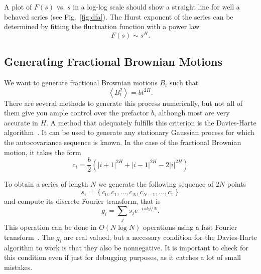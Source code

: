A plot of $F(s)$ vs. $s$ in a log-log scale should show a straight line for
well a behaved series (see Fig.~\ref{fig:dfa}). The Hurst exponent of the
series can be determined by fitting the fluctuation function with a power law
\begin{equation}
    F(s)\sim s^H.
\end{equation}

\subsection{Generating Fractional Brownian Motions}
\label{sec:fbm}

We want to generate fractional Brownian motions $B_t$ such that
\begin{equation}
    \label{eq:fbm}
    \left\langle B_t^2 \right\rangle = bt^{2H}.
\end{equation}
There are several methods to generate this process numerically, but not all of
them give you ample control over the prefactor $b$, although most are very
accurate in $H$. A method that adequately fulfills this criterion is the
Davies-Harte algorithm~\cite{Davies1987}. It can be used to generate any
stationary Gaussian process for which the autocovariance sequence is known. In
the case of the fractional Brownian motion, it takes the form
\begin{equation}
    c_i = \frac{b}{2} \left(
            \left|i+1\right|^{2H} +
            \left|i-1\right|^{2H} -
            2\left|i\right|^{2H}
          \right)
\end{equation}

To obtain a series of length $N$ we generate the following sequence of $2N$
points
\begin{equation}
    s_i=\left\{c_{0},c_{1},\ldots,c_{N},c_{N-1},\ldots,c_{1}\right\}
\end{equation}
and compute its discrete Fourier transform, that is
\begin{equation}
    g_{i}=\sum_{j}s_{j}e^{-i\pi kj/N}.
\end{equation}
This operation can be done in $O(N\log N)$ operations using a fast Fourier
transform~\cite{Frigo2002}. The $g_i$ are real valued, but a necessary condition for the
Davies-Harte algorithm to work is that they also be nonnegative. It is
important to check for this condition even if just for debugging purposes,
as it catches a lot of small mistakes.

